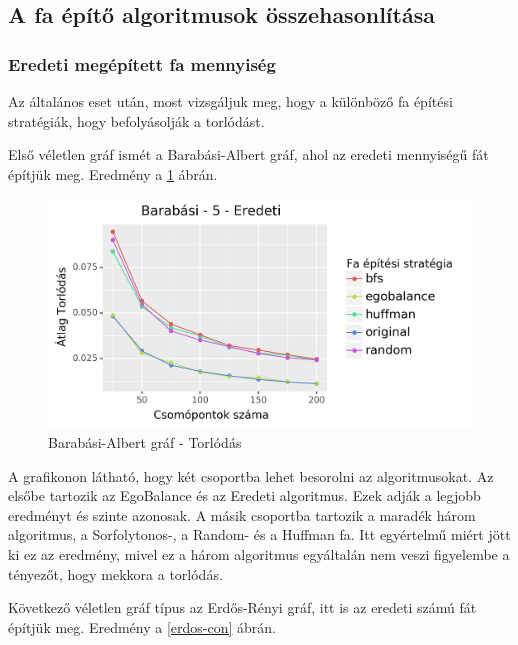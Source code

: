 \documentclass[12pt]{report}
\begin{document}
\subsection{A fa építő algoritmusok összehasonlítása}

\subsubsection{Eredeti megépített fa mennyiség}

Az általános eset után, most vizsgáljuk meg, hogy a különböző fa építési stratégiák, hogy befolyásolják a torlódást.

Első véletlen gráf ismét a Barabási-Albert gráf, ahol az eredeti mennyiségű fát építjük meg. 
Eredmény a \ref{barabasi-con} ábrán.

\begin{figure}[H]
	\begin{center}
		\includegraphics[width=0.9\linewidth]{pictures/barabasi_con_e.png}
		\caption{Barabási-Albert gráf - Torlódás}
		\label{barabasi-con}
	\end{center}
\end{figure}

A grafikonon látható, hogy két csoportba lehet besorolni az algoritmusokat. 
Az elsőbe tartozik az EgoBalance és az Eredeti algoritmus.
Ezek adják a legjobb eredményt és szinte azonosak.
A másik csoportba tartozik a maradék három algoritmus, a Sorfolytonos-, a Random- és a Huffman fa.
Itt egyértelmű miért jött ki ez az eredmény, mivel ez a három algoritmus egyáltalán nem veszi figyelembe a tényezőt, hogy mekkora a torlódás.

Következő véletlen gráf típus az Erdős-Rényi gráf, itt is az eredeti számú fát építjük meg. 
Eredmény a \ref{erdos-con} ábrán.
\end{document}
